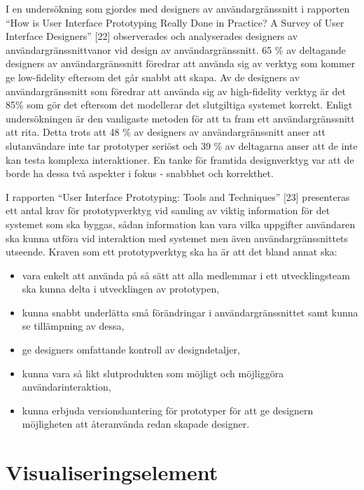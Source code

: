 \documentclass{kththesis}
\begin{document}
I en undersökning som gjordes med designers av användargränssnitt i rapporten “How is User Interface Prototyping Really Done in Practice? A Survey of User Interface Designers” [22] observerades och analyserades designers av användargränssnittvanor vid design av användargränssnitt. 65 \% av deltagande designers av användargränssnitt föredrar att använda sig av verktyg som kommer ge low-fidelity eftersom det går snabbt att skapa. Av de designers av användargränssnitt som föredrar att använda sig av high-fidelity verktyg är det 85\% som gör det eftersom det modellerar det slutgiltiga systemet korrekt. Enligt undersökningen är den vanligaste metoden för att ta fram ett användargränssnitt att rita. Detta trots att 48 \% av designers av användargränssnitt anser att slutanvändare inte tar prototyper seriöst och 39 \% av deltagarna anser att de inte kan testa komplexa interaktioner.  En tanke för framtida designverktyg var att de borde ha dessa två aspekter i fokus - snabbhet och korrekthet. 

I rapporten “User Interface Prototyping: Tools and Techniques” [23] presenteras ett antal krav för prototypverktyg vid samling av viktig information för det systemet som ska byggas, sådan information kan vara vilka uppgifter användaren ska kunna utföra vid interaktion med systemet men även användargränssnittets utseende. Kraven som ett prototypverktyg ska ha är att det bland annat ska: 

\begin{itemize}
\item vara enkelt att använda på så sätt att alla medlemmar i ett utvecklingsteam ska kunna delta i utvecklingen av prototypen,
\item kunna snabbt underlätta små förändringar i användargränssnittet samt kunna se tillämpning av dessa,
\item ge designers omfattande kontroll av designdetaljer,
\item kunna vara så likt slutprodukten som möjligt och möjliggöra användarinteraktion,
\item kunna erbjuda versionshantering för prototyper för att ge designern möjligheten att återanvända redan skapade designer.

\end{itemize}

\section{Visualiseringselement} 
\end{document}
